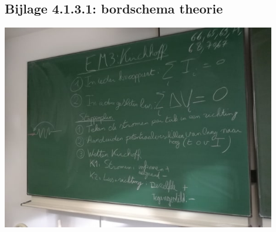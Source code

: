 \subsection*{Bijlage 4.1.3.1: bordschema theorie}
\begin{center}
	\includegraphics[width=0.9\textwidth]{Bord3}
\end{center}
\newpage









